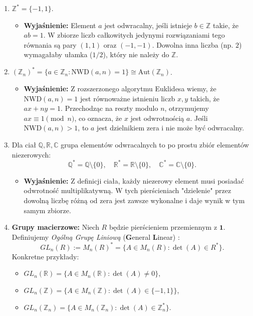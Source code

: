 \begin{enumerate}[label=\arabic*)]
    \item $\mathbb{Z}^{\ast} = \{-1, 1\}$.
    \begin{itemize}
        \item \textbf{Wyjaśnienie:} Element $a$ jest odwracalny, jeśli istnieje $b \in \mathbb{Z}$ takie, że $ab = 1$. W zbiorze liczb całkowitych jedynymi rozwiązaniami tego równania są pary $(1,1)$ oraz $(-1,-1)$. Dowolna inna liczba (np. $2$) wymagałaby ułamka ($1/2$), który nie należy do $\mathbb{Z}$.
    \end{itemize}

    \item $(\mathbb{Z}_{n})^{\ast} = \{a \in \mathbb{Z}_{n} : \text{NWD}(a,n) = 1\} \cong \text{Aut}(\mathbb{Z}_{n})$.
    \begin{itemize}
        \item \textbf{Wyjaśnienie:} Z rozszerzonego algorytmu Euklidesa wiemy, że $\text{NWD}(a,n)=1$ jest równoważne istnieniu liczb $x, y$ takich, że $ax + ny = 1$. Przechodząc na reszty modulo $n$, otrzymujemy $ax \equiv 1 \pmod{n}$, co oznacza, że $x$ jest odwrotnością $a$. Jeśli $\text{NWD}(a,n) > 1$, to $a$ jest dzielnikiem zera i nie może być odwracalny.
    \end{itemize}

    \item Dla ciał $\mathbb{Q}, \mathbb{R}, \mathbb{C}$ grupa elementów odwracalnych to po prostu zbiór elementów niezerowych:
    \[ \mathbb{Q}^{\ast} = \mathbb{Q}\setminus \{0\}, \quad \mathbb{R}^{\ast} = \mathbb{R} \setminus \{0\}, \quad \mathbb{C}^{\ast} = \mathbb{C} \setminus \{0\}. \]
    \begin{itemize}
        \item \textbf{Wyjaśnienie:} Z definicji ciała, każdy niezerowy element musi posiadać odwrotność multiplikatywną. W tych pierścieniach "dzielenie" przez dowolną liczbę różną od zera jest zawsze wykonalne i daje wynik w tym samym zbiorze.
    \end{itemize}

    \item \textbf{Grupy macierzowe:} Niech $R$ będzie pierścieniem przemiennym z $\mathbf{1}$. 
    Definiujemy \textit{Ogólną Grupę Liniową} (\textbf{G}eneral \textbf{L}inear) :
    \[ 
        GL_{n}(R) := M_n(R)^{\ast} = \{A\in M_{n}(R) : \det(A) \in R^{\ast} \}.
    \]
    Konkretne przykłady:
    \begin{itemize}
        \item $GL_{n}(\mathbb{R}) = \{A\in M_{n}(\mathbb{R}) : \det(A) \neq 0\}$,
        \item $GL_{n}(\mathbb{Z}) = \{A\in M_{n}(\mathbb{Z}) : \det(A) \in \{-1, 1\}\}$,
        \item $GL_{n}(\mathbb{Z}_n) = \{A\in M_{n}(\mathbb{Z}_n) : \det(A) \in \mathbb{Z}_n^{\ast}\}$.
    \end{itemize}
    

\end{enumerate}
